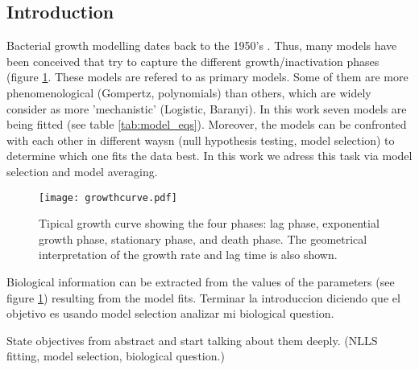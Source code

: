 \documentclass[titlepage,11pt]{article}
\begin{document}
	\begin{linenumbers}
		\section{Introduction}\label{sec:introduction}
		Bacterial growth modelling dates back to the 1950's \cite{Schaechter2015}. Thus, many models have been conceived that try to capture the different growth/inactivation phases (figure \ref{fig:growthcurve}. These models are refered to as primary models. Some of them are more phenomenological (Gompertz, polynomials) than others, which are widely consider as more 'mechanistic' (Logistic, Baranyi). In this work seven models are being fitted (see table \ref{tab:model_eqs}). Moreover, the models can be confronted with each other in different waysn (null hypothesis testing, model selection) to determine which one fits the data best. In this work we adress this task via model selection and model averaging. \\
		
		\begin{figure}[h]
			\centering
			\texttt{[image: growthcurve.pdf]}
			\caption{Tipical growth curve showing the four phases: lag phase, exponential growth phase, stationary phase, and death phase. The geometrical interpretation of the growth rate and lag time is also shown.}
			\label{fig:growthcurve}
		\end{figure}
		Biological information can be extracted from the values of the parameters (see figure \ref{fig:growthcurve}) resulting from the model fits. 
		  	Terminar la introduccion diciendo que el objetivo es usando model selection analizar mi biological question.
		
		State objectives from abstract and start talking about them deeply. (NLLS fitting, model selection, biological question.)\\
		

\end{linenumbers}
\end{document}
